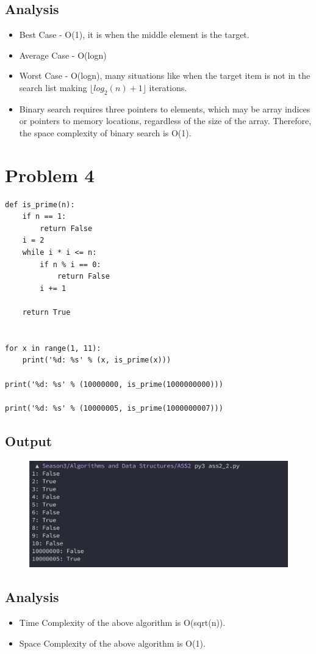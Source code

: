 \documentclass{article}
\begin{document}
\subsection{Analysis}
\begin{itemize}
    \item Best Case - O(1), it is when the middle element is the target.
    \item Average Case - O(logn)
    \item Worst Case - O(logn), many situations like when the target item is not in the search list making $\lfloor log_2(n)+1 \rfloor$ iterations.
    \item Binary search requires three pointers to elements, which may be array indices or pointers to memory locations, regardless of the size of the array. Therefore, the space complexity of binary search is O(1).
\end{itemize}

\section{Problem 4}
\begin{lstlisting}
def is_prime(n):
    if n == 1:
        return False
    i = 2
    while i * i <= n:
        if n % i == 0:
            return False
        i += 1

    return True


for x in range(1, 11):
    print('%d: %s' % (x, is_prime(x)))

print('%d: %s' % (10000000, is_prime(1000000000)))

print('%d: %s' % (10000005, is_prime(1000000007)))
\end{lstlisting}

\subsection{Output}
\begin{figure}[H]
    \includegraphics[width=1\textwidth]{Fig2.png}
\end{figure}

\subsection{Analysis}
\begin{itemize}
    \item Time Complexity of the above algorithm is O(sqrt(n)).
    \item Space Complexity of the above algorithm is O(1).
\end{itemize}
\end{document}
